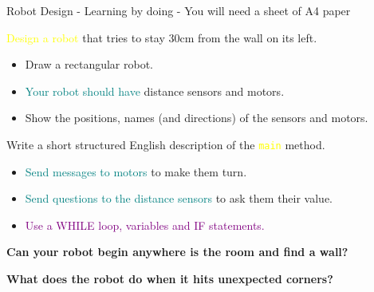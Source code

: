 \documentclass[color=pdftex,usenames,dvipsnames, aspectratio=169]{beamer}
\begin{document}
\begin{frame}{Robot Design - \alert{Learning by doing} - You will need a sheet of A4 paper}
\vspace*{-3mm}\centering{\Large \textcolor{OliveGreen}{If you’re watching a video - pause it now}}

\begin{block}{\textcolor{yellow}{Design a robot} that tries to stay 30cm from the wall on its left.}

\begin{itemize}
  \item Draw a rectangular robot.
\item  \textcolor{teal}{Your robot should have} \alert{distance sensors} and \alert{motors}. 
\item Show the positions, names (and directions) of the sensors and motors. 
\end{itemize}
\end{block}

\begin{block}{Write a short \alert{structured English description} of the \textcolor{yellow}{\Verb!main!} method.}

\begin{itemize}
\item \textcolor{teal}{Send messages to motors} to make them turn.
\item \textcolor{teal}{Send questions to the distance sensors} to ask them their value.
\item \textcolor{purple}{Use a WHILE loop, variables and IF statements.}
\end{itemize}
\begin{centering}
\end{centering}
\end{block}

 \textbf{Can your robot begin anywhere is the room and find a wall?}

\vspace*{-2mm}\textbf{\alert{What does the robot do when it hits unexpected corners?}}


\end{frame}
\end{document}
